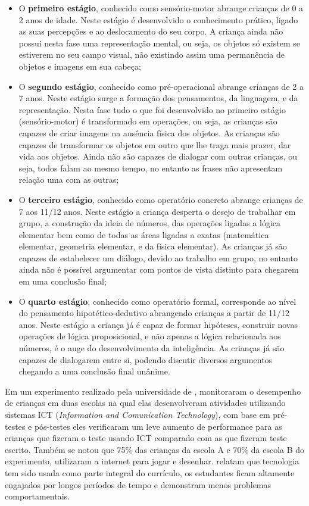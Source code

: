 \begin{itemize}
	\item O \textbf{primeiro estágio}, conhecido como sensório-motor abrange crianças de 0 a 2 anos de idade. Neste estágio
	é desenvolvido o conhecimento prático, ligado as suas percepções e ao deslocamento do seu corpo. A criança ainda não
	possui nesta fase uma representação mental, ou seja, os objetos só existem se estiverem no seu campo visual, não existindo
	assim uma permanência de objetos e imagens em sua cabeça;

	\item O \textbf{segundo estágio}, conhecido como pré-operacional abrange crianças de 2 a 7 anos. Neste estágio surge
	a formação dos pensamentos, da linguagem, e da representação. Nesta fase tudo o que foi desenvolvido no primeiro estágio
	(sensório-motor) é transformado em operações, ou seja, as crianças são capazes de criar imagens na ausência física dos
	objetos. As crianças são capazes de transformar os objetos em outro que lhe traga mais prazer, dar vida aos objetos. Ainda
	não são capazes de dialogar com outras crianças, ou seja, todos falam ao mesmo tempo, no entanto as frases não apresentam
	relação uma com as outras;

	\item O \textbf{terceiro estágio}, conhecido como operatório concreto abrange crianças de 7 aos 11/12 anos. Neste estágio
	a criança desperta o desejo de trabalhar em grupo, a construção da ideia de números, das operações ligadas a lógica elementar
	bem como de todas as áreas ligadas a exatas (matemática elementar, geometria elementar, e da física elementar). As crianças
	já são capazes de estabelecer um diálogo, devido ao trabalho em grupo, no entanto ainda não é possível argumentar com
	pontos de vista distinto para chegarem em uma conclusão final;

	\item O \textbf{quarto estágio}, conhecido como operatório formal, corresponde ao nível do pensamento hipotético-dedutivo
	abrangendo crianças a partir de 11/12 anos. Neste estágio a criança já é capaz de formar hipóteses, construir novas operações 
	de lógica proposicional, e não apenas a lógica relacionada aos números, é o auge do desenvolvimento da inteligência. As 
	crianças já são capazes de dialogarem entre si, podendo discutir diversos argumentos chegando a uma conclusão final unânime.
\end{itemize}

Em um experimento realizado pela universidade de , monitoraram o desempenho de crianças em duas escolas
na qual elas desenvolveram atividades utilizando sistemas ICT (\textit{Information and Comunication Technology}), com base em pré-testes
e pós-testes eles verificaram um leve aumento de performance para as crianças que fizeram o teste usando ICT comparado com as que
fizeram teste escrito. Também se notou que 75\% das crianças da escola A e 70\% da escola B do experimento, utilizaram a internet
para jogar e desenhar. relatam que tecnologia tem sido usada como parte integral do currículo, os estudantes 
ficam altamente engajados por longos períodos de tempo e demonstram menos problemas comportamentais. 

